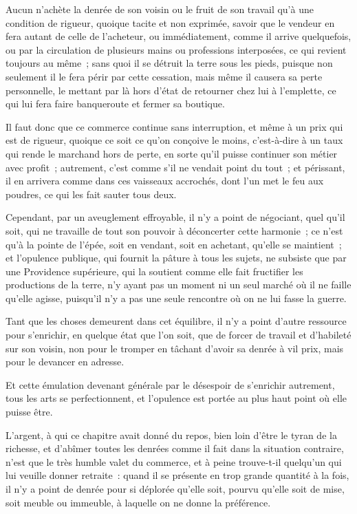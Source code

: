 \documentclass[french,twoside]{book} %
\begin{document}
Aucun n’achète la denrée de son voisin ou le fruit de son travail qu’à une condition de rigueur, quoique tacite et non exprimée, savoir que le vendeur en fera autant de celle de l’acheteur, ou immédiatement, comme il arrive quelquefois, ou par la circulation de plusieurs mains ou professions interposées, ce qui revient toujours au même ; sans quoi il se détruit la terre sous les pieds, puisque non seulement il le fera périr par cette cessation, mais même il causera sa perte personnelle, le mettant par là hors d’état de retourner chez lui à l’emplette, ce qui lui fera faire banqueroute et fermer sa boutique.\par
Il faut donc que ce commerce continue sans interruption, et même à un prix qui est de rigueur, quoique ce soit ce qu’on conçoive le moins, c’est-à-dire à un taux qui rende le marchand hors de perte, en sorte qu’il puisse continuer son métier avec profit ; autrement, c’est comme s’il ne vendait point du tout ; et périssant, il en arrivera comme dans ces vaisseaux accrochés, dont l’un met le feu aux poudres, ce qui les fait sauter tous deux.\par
Cependant, par un aveuglement effroyable, il n’y a point de négociant, quel qu’il soit, qui ne travaille de tout son pouvoir à déconcerter cette harmonie ; ce n’est qu’à la pointe de l’épée, soit en vendant, soit en achetant, qu’elle se maintient ; et l’opulence publique, qui fournit la pâture à tous les sujets, ne subsiste que par une Providence supérieure, qui la soutient comme elle fait fructifier les productions de la terre, n’y ayant pas un moment ni un seul marché où il ne faille qu’elle agisse, puisqu’il n’y a pas une seule rencontre où on ne lui fasse la guerre.\par
Tant que les choses demeurent dans cet équilibre, il n’y a point d’autre ressource pour s’enrichir, en quelque état que l’on soit, que de forcer de travail et d’habileté sur son voisin, non pour le tromper en tâchant d’avoir sa denrée à vil prix, mais pour le devancer en adresse.\par
Et cette émulation devenant générale par le désespoir de s’enrichir autrement, tous les arts se perfectionnent, et l’opulence est portée au plus haut point où elle puisse être.\par
L’argent, à qui ce chapitre avait donné du repos, bien loin d’être le tyran de la richesse, et d’abîmer toutes les denrées comme il fait dans la situation contraire, n’est que le très humble valet du commerce, et à peine trouve-t-il quelqu’un qui lui veuille donner retraite : quand il se présente en trop grande quantité à la fois, il n’y a point de denrée pour si déplorée qu’elle soit, pourvu qu’elle soit de mise, soit meuble ou immeuble, à laquelle on ne donne la préférence.\par
\end{document}
